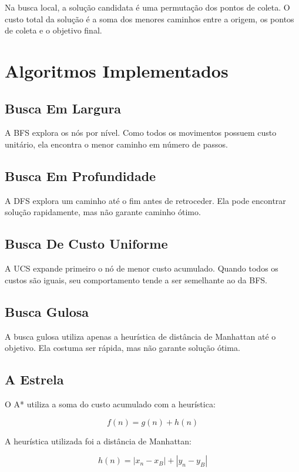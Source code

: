 \documentclass[12pt,a4paper]{article}
\begin{document}
Na busca local, a solução candidata é uma permutação dos pontos de coleta. O custo total da solução é a soma dos menores caminhos entre a origem, os pontos de coleta e o objetivo final.

\section{Algoritmos Implementados}

\subsection{Busca Em Largura}

A BFS explora os nós por nível. Como todos os movimentos possuem custo unitário, ela encontra o menor caminho em número de passos.

\subsection{Busca Em Profundidade}

A DFS explora um caminho até o fim antes de retroceder. Ela pode encontrar solução rapidamente, mas não garante caminho ótimo.

\subsection{Busca De Custo Uniforme}

A UCS expande primeiro o nó de menor custo acumulado. Quando todos os custos são iguais, seu comportamento tende a ser semelhante ao da BFS.

\subsection{Busca Gulosa}

A busca gulosa utiliza apenas a heurística de distância de Manhattan até o objetivo. Ela costuma ser rápida, mas não garante solução ótima.

\subsection{A Estrela}

O A* utiliza a soma do custo acumulado com a heurística:

\[
f(n) = g(n) + h(n)
\]

A heurística utilizada foi a distância de Manhattan:

\[
h(n) = |x_n - x_B| + |y_n - y_B|
\]
\end{document}
